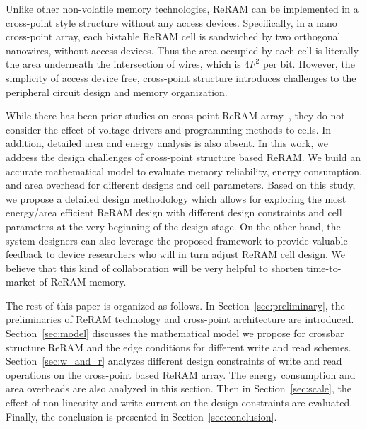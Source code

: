 Unlike other non-volatile memory technologies, ReRAM can be implemented in
a cross-point style structure without any access devices. Specifically, in
a nano cross-point array, each bistable ReRAM cell is sandwiched by two
orthogonal nanowires, without access devices. Thus the area occupied by
each cell is literally the area underneath the intersection of wires,
which is $4F^2$ per bit. However, the simplicity of access device free,
cross-point structure introduces challenges to the peripheral circuit
design and memory organization.

While there has been prior studies on cross-point ReRAM
array~\cite{crossbar_NANO2002_Ziegler,crossbar_NANO08_Flocke,crossbar_TED_2010,crossbar_NANO2003_Ziegler},
they do not consider the effect of voltage drivers and programming methods
to cells. In addition, detailed area and energy analysis is also absent.
In this work, we address the design challenges of cross-point structure
based ReRAM. We build an accurate mathematical model to evaluate memory
reliability, energy consumption, and area overhead for different designs
and cell parameters. Based on this study, we propose a detailed design
methodology which allows for exploring the most energy/area efficient
ReRAM design with different design constraints and cell parameters at the
very beginning of the design stage. On the other hand, the system
designers can also leverage the proposed framework to provide valuable
feedback to device researchers who will in turn adjust ReRAM cell design.
We believe that this kind of collaboration will be very helpful to shorten
time-to-market of ReRAM memory.

The rest of this paper is organized as follows. In
Section~\ref{sec:preliminary}, the preliminaries of ReRAM technology and
cross-point architecture are introduced. Section~\ref{sec:model} discusses
the mathematical model we propose for crossbar structure ReRAM and the
edge conditions for different write and read schemes.
Section~\ref{sec:w_and_r} analyzes different design constraints of write
and read operations on the cross-point based ReRAM array. The energy
consumption and area overheads are also analyzed in this section. Then in
Section~\ref{sec:scale}, the effect of non-linearity and write current on
the design constraints are evaluated. Finally, the conclusion is presented
in Section~\ref{sec:conclusion}.
